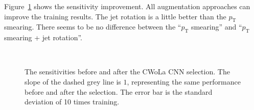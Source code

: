 \documentclass[12pt]{article}
\begin{document}
        Figure~\ref{fig:sensitivity_improvement_origin_pt_jet_aug_3} shows the sensitivity improvement. All augmentation approaches can improve the training results. The jet rotation is a little better than the $p_{\text{T}}$ smearing. There seems to be no difference between the ``$p_{\text{T}}$ smearing'' and ``$p_{\text{T}}$ smearing + jet rotation''.
        \begin{figure}[htpb]
            \centering
             \\
            \caption{The sensitivities before and after the CWoLa CNN selection. The slope of the dashed grey line is $1$, representing the same performance before and after the selection. The error bar is the standard deviation of 10 times training.}
            \label{fig:sensitivity_improvement_origin_pt_jet_aug_3}
        \end{figure}
\end{document}
